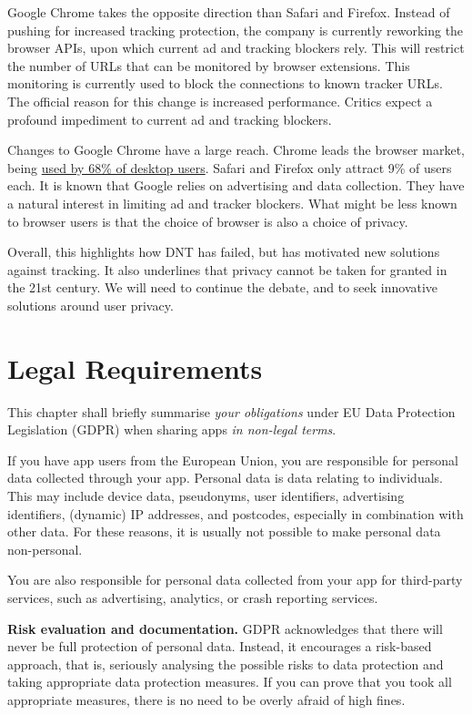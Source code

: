 \documentclass[
]{book}
\begin{document}
Google Chrome takes the opposite direction than Safari and Firefox. Instead of pushing for increased tracking protection, the company is currently reworking the browser APIs, upon which current ad and tracking blockers rely. This will restrict the number of URLs that can be monitored by browser extensions. This monitoring is currently used to block the connections to known tracker URLs. The official reason for this change is increased performance. Critics expect a profound impediment to current ad and tracking blockers.

Changes to Google Chrome have a large reach. Chrome leads the browser market, being \href{https://gs.statcounter.com/browser-market-share/desktop/worldwide}{used by 68\% of desktop users}. Safari and Firefox only attract 9\% of users each. It is known that Google relies on advertising and data collection. They have a natural interest in limiting ad and tracker blockers. What might be less known to browser users is that the choice of browser is also a choice of privacy.

Overall, this highlights how DNT has failed, but has motivated new solutions against tracking. It also underlines that privacy cannot be taken for granted in the 21st century. We will need to continue the debate, and to seek innovative solutions around user privacy.

\hypertarget{legal-requirements}{%
\chapter{Legal Requirements}\label{legal-requirements}}

This chapter shall briefly summarise \emph{your obligations} under EU Data Protection Legislation (GDPR) when sharing apps \emph{in non-legal terms}.

If you have app users from the European Union, you are responsible for personal data collected through your app. Personal data is data relating to individuals. This may include device data, pseudonyms, user identifiers, advertising identifiers, (dynamic) IP addresses, and postcodes, especially in combination with other data. For these reasons, it is usually not possible to make personal data non-personal.

You are also responsible for personal data collected from your app for third-party services, such as advertising, analytics, or crash reporting services.

\textbf{Risk evaluation and documentation.} GDPR acknowledges that there will never be full protection of personal data. Instead, it encourages a risk-based approach, that is, seriously analysing the possible risks to data protection and taking appropriate data protection measures. If you can prove that you took all appropriate measures, there is no need to be overly afraid of high fines.
\end{document}
